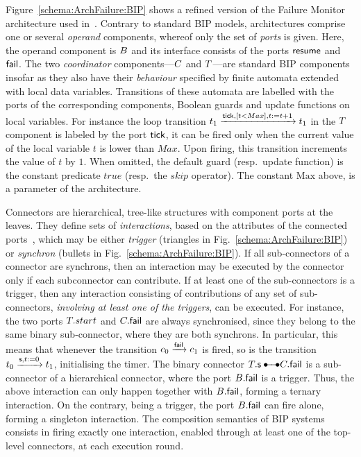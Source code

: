 \documentclass[smallcondensed]{svjour3}
\newcommand{\mdash}{---}
\newcommand{\resp}[1][\ ]{resp.#1}
\newcommand{\goesto}[2][]{\ensuremath{\xrightarrow[#1]{#2}}}
\newcommand{\true}{\ensuremath{\mathit{true}}}
\begin{document}
Figure~\ref{schema:ArchFailure:BIP} shows a refined version of the
Failure Monitor architecture used in~\cite{CubETH-case-study}.
Contrary to standard BIP models, architectures comprise one or several
\emph{operand} components, whereof only the set of \emph{ports} is
given.  Here, the operand component is $B$ and its interface
consists of the ports $\mathsf{resume}$ and $\mathsf{fail}$.
The two \emph{coordinator} components\mdash $C$ and
$T$\mdash are standard BIP components insofar as they also
have their \emph{behaviour} specified by finite automata extended with
local data variables.  Transitions of these automata are labelled with
the ports of the corresponding components, Boolean guards and update
functions on local variables.  For instance the loop transition
$t_1 \goesto{\PortTick, [t < Max], t:=t+1} t_1$
in the $T$ component is labeled by the port $\mathsf{tick}$, it
can be fired only when the current value of the local variable $t$ is
lower than $Max$.  Upon firing, this transition increments the value
of $t$ by $1$.  When omitted, the default guard (\resp update
function) is the constant predicate $\true$ (\resp the $\mathit{skip}$
operator).  The constant $\mathrm{Max}$ above, is a parameter of the
architecture.

Connectors are hierarchical, tree-like structures with component ports
at the leaves.  They define sets of \emph{interactions}, based on the
attributes of the connected ports~\cite{BliSif08-acp-tc}, which may be
either \emph{trigger} (triangles in Fig.~\ref{schema:ArchFailure:BIP})
or \emph{synchron} (bullets in Fig.~\ref{schema:ArchFailure:BIP}).
%
If all sub-connectors of a connector are synchrons, then an
interaction may be executed by the connector only if each subconnector
can contribute.
%
If at least one of the sub-connectors is a trigger, then any
interaction consisting of contributions of any set of sub-connectors,
\emph{involving at least one of the triggers}, can be executed.
%
For instance, the two ports $T.start$ and
$C.\mathsf{fail}$ are always synchronised, since they belong to
the same binary sub-connector, where they are both synchrons.  In
particular, this means that whenever the transition 
$c_0 \goesto{\PortFail} c_1$ is fired, so is the transition
$t_0 \goesto{\PortStart, t:=0} t_1$,
initialising the timer.  The binary connector $\NameTimer.\PortStart
\bullet\!\!\!-\!\!\!-\!\!\!\bullet \NameCtrl.\PortFail$ is a
sub-connector of a hierarchical connector, where the port
$B.\mathsf{fail}$ is a trigger.  Thus, the above interaction can
only happen together with $B.\mathsf{fail}$, forming a
ternary interaction.  On the contrary, being a trigger, the port
$B.\mathsf{fail}$ can fire alone, forming a singleton
interaction.  The composition semantics of BIP systems consists in
firing exactly one interaction, enabled through at least one of the
top-level connectors, at each execution round.
\end{document}
